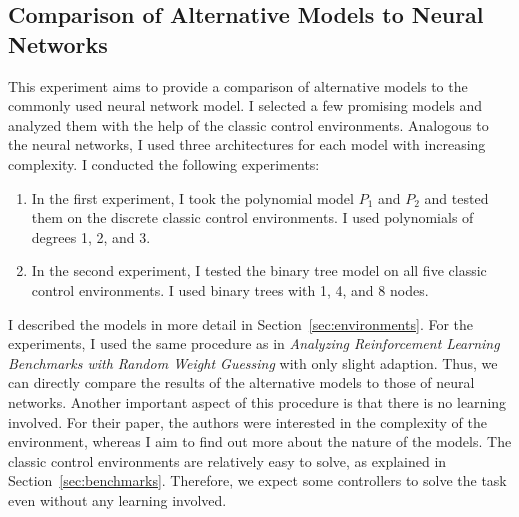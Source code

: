 \subsection{Comparison of Alternative Models to Neural Networks}
This experiment aims to provide a comparison of alternative models to the commonly used neural network model. I selected a few promising models and analyzed them with the help of the classic control environments. Analogous to the neural networks, I used three architectures for each model with increasing complexity. I conducted the following experiments:
\begin{enumerate}[label=(\alph*)]
  \item In the first experiment, I took the polynomial model $P_1$ and $P_2$ and tested them on the discrete classic control environments. I used polynomials of degrees 1, 2, and 3.
  \item In the second experiment, I tested the binary tree model on all five classic control environments. I used binary trees with 1, 4, and 8 nodes.
\end{enumerate}
I described the models in more detail in Section~\ref{sec:environments}. For the experiments, I used the same procedure as in \emph{Analyzing Reinforcement Learning Benchmarks with Random Weight Guessing} with only slight adaption. Thus, we can directly compare the results of the alternative models to those of neural networks. Another important aspect of this procedure is that there is no learning involved. For their paper, the authors were interested in the complexity of the environment, whereas I aim to find out more about the nature of the models. The classic control environments are relatively easy to solve, as explained in Section~\ref{sec:benchmarks}. Therefore, we expect some controllers to solve the task even without any learning involved.

